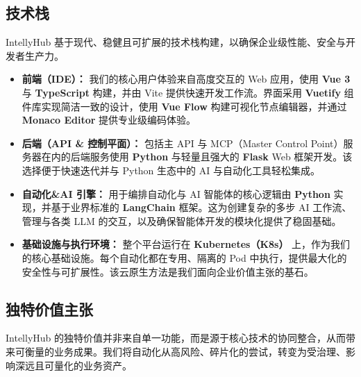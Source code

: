 \documentclass[11pt, a4paper, oneside]{article}
\begin{document}
\pagebreak
\subsection{技术栈}
IntellyHub 基于现代、稳健且可扩展的技术栈构建，以确保企业级性能、安全与开发者生产力。

\begin{itemize}
\item \textbf{前端（IDE）：} 我们的核心用户体验来自高度交互的 Web 应用，使用 \textbf{Vue 3} 与 \textbf{TypeScript} 构建，并由 Vite 提供快速开发工作流。界面采用 \textbf{Vuetify} 组件库实现简洁一致的设计，使用 \textbf{Vue Flow} 构建可视化节点编辑器，并通过 \textbf{Monaco Editor} 提供专业级编码体验。

\item \textbf{后端（API \& 控制平面）：} 包括主 API 与 MCP（Master Control Point）服务器在内的后端服务使用 \textbf{Python} 与轻量且强大的 \textbf{Flask} Web 框架开发。该选择便于快速迭代并与 Python 生态中的 AI 与自动化工具轻松集成。

\item \textbf{自动化\&AI 引擎：} 用于编排自动化与 AI 智能体的核心逻辑由 \textbf{Python} 实现，并基于业界标准的 \textbf{LangChain} 框架。这为创建复杂的多步 AI 工作流、管理与各类 LLM 的交互，以及确保智能体开发的模块化提供了稳固基础。

\item \textbf{基础设施与执行环境：} 整个平台运行在 \textbf{Kubernetes（K8s）} 上，作为我们的核心基础设施。每个自动化都在专用、隔离的 Pod 中执行，提供最大化的安全性与可扩展性。该云原生方法是我们面向企业价值主张的基石。
\end{itemize}

\subsection{独特价值主张}
IntellyHub 的独特价值并非来自单一功能，而是源于核心技术的协同整合，从而带来可衡量的业务成果。我们将自动化从高风险、碎片化的尝试，转变为受治理、影响深远且可量化的业务资产。
\end{document}
